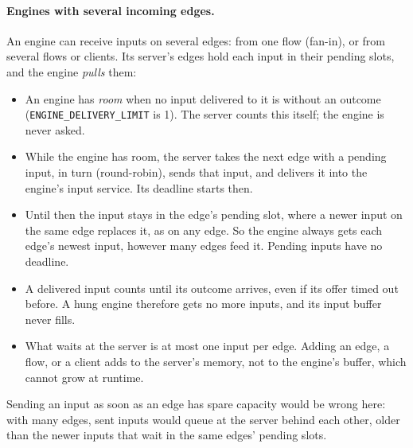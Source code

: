 \documentclass[11pt]{article}
\newcommand{\code}[1]{\texttt{#1}}
\begin{document}
\paragraph{Engines with several incoming edges.} An engine can receive inputs
on several edges: from one flow (fan-in), or from several flows or clients.
Its server's edges hold each input in their pending slots, and the engine
\emph{pulls} them:
\begin{itemize}[nosep]
  \item An engine has \emph{room} when no input delivered to it is without an
        outcome (\code{ENGINE\_DELIVERY\_LIMIT} is 1). The server counts this
        itself; the engine is never asked.
  \item While the engine has room, the server takes the next edge with a
        pending input, in turn (round-robin), sends that input, and delivers
        it into the engine's input service. Its deadline starts then.
  \item Until then the input stays in the edge's pending slot, where a newer
        input on the same edge replaces it, as on any edge. So the engine
        always gets each edge's newest input, however many edges feed it.
        Pending inputs have no deadline.
  \item A delivered input counts until its outcome arrives, even if its offer
        timed out before. A hung engine therefore gets no more inputs, and its
        input buffer never fills.
  \item What waits at the server is at most one input per edge. Adding an
        edge, a flow, or a client adds to the server's memory, not to the
        engine's buffer, which cannot grow at runtime.
\end{itemize}
Sending an input as soon as an edge has spare capacity would be wrong here:
with many edges, sent inputs would queue at the server behind each other,
older than the newer inputs that wait in the same edges' pending slots.
\end{document}
